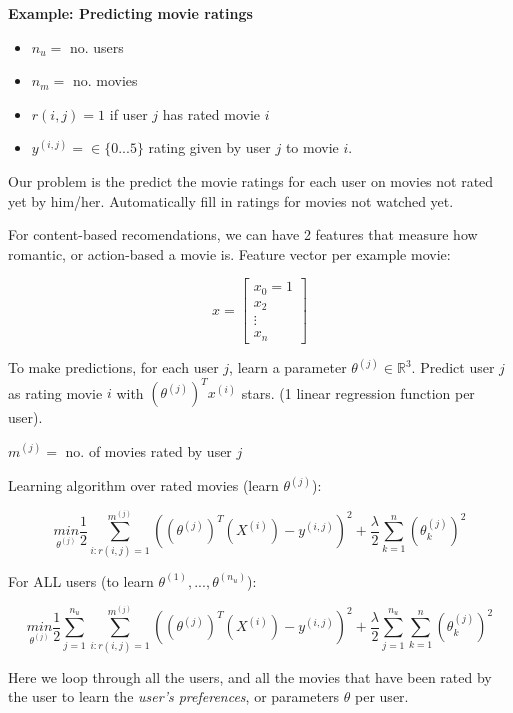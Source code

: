 \documentclass{article}
\begin{document}
\textbf{Example: Predicting movie ratings} 

\begin{itemize}
    \item $n_u =$ no. users
    \item $n_m =$ no. movies
    \item $r(i, j) = 1$ if user $j$ has rated movie $i$
    \item $y^{(i,j)} = \in \{0 ... 5\}$ rating given by user $j$ to movie $i$.
    
\end{itemize}

Our problem is the predict the movie ratings for each user on movies not rated yet by him/her. Automatically fill in ratings for movies not watched yet.


For content-based recomendations, we can have 2 features that measure how romantic, or action-based a movie is. Feature vector per example movie:

\begin{equation}
    x = \begin{bmatrix}
    x_0 = 1 \\
    x_2 \\
    \vdots \\
    x_n
    \end{bmatrix}
\end{equation}

To make predictions, for each user $j$, learn a parameter $\theta^{(j)} \in \mathbb{R}^3$. Predict user $j$ as rating movie $i$ with $(\theta^{(j)})^T x^{(i)}$ stars. (1 linear regression function per user).


$m^{(j)} =$ no. of movies rated by user $j$

\hspace{1pt}

Learning algorithm over rated movies (learn $\theta^{(j)}$):

\begin{equation}
    \underset{\theta^{(j)}}{min} \frac{1}{2} \sum_{i: r(i, j) = 1}^{m^{(j)}} \left ((\theta^{(j)})^T(X^{(i)}) - y^{(i, j)} \right)^2 + \frac{\lambda}{2} \sum_{k=1}^{n} (\theta_k^{(j)})^2
\end{equation}

\begin{mybox}
For ALL users (to learn $\theta^{(1)}, ..., \theta^{(n_u)}$):

\begin{equation}
     \underset{\theta^{(j)}}{min} \frac{1}{2} \sum_{j=1}^{n_u} \sum_{i: r(i, j) = 1}^{m^{(j)}} \left ((\theta^{(j)})^T(X^{(i)}) - y^{(i, j)} \right)^2 +  \frac{\lambda}{2} \sum_{j=1}^{n_u} \sum_{k=1}^{n} (\theta_k^{(j)})^2
\end{equation}

Here we loop through all the users, and all the movies that have been rated by the user to learn the \textit{user's preferences}, or parameters $\theta$ per user.

\end{mybox}
\end{document}
